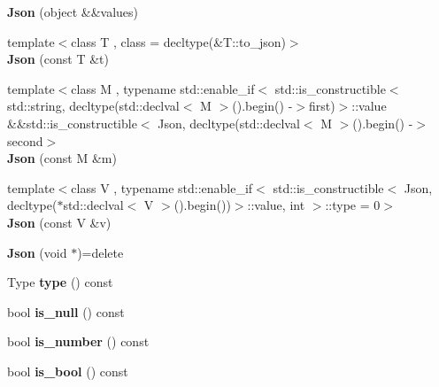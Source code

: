 \begin{DoxyCompactItemize}
{\bfseries Json} (object \&\&values)
\item 
\mbox{\label{classjson11_1_1_json_a68428d2973dd0f8329e76cf8671ac2ee}} 
{\footnotesize template$<$class T , class  = decltype(\&\+T\+::to\+\_\+json)$>$ }\\{\bfseries Json} (const T \&t)
\item 
\mbox{\label{classjson11_1_1_json_a09507879fb68f3ae2e834a1cd07a55dc}} 
{\footnotesize template$<$class M , typename std\+::enable\+\_\+if$<$ std\+::is\+\_\+constructible$<$ std\+::string, decltype(std\+::declval$<$ M $>$().\+begin() -\/$>$first)$>$\+::value \&\&std\+::is\+\_\+constructible$<$ Json, decltype(std\+::declval$<$ M $>$().\+begin() -\/$>$ second$>$ }\\{\bfseries Json} (const M \&m)
\item 
\mbox{\label{classjson11_1_1_json_aad054850a09c0ba50d46f276aa269ce3}} 
{\footnotesize template$<$class V , typename std\+::enable\+\_\+if$<$ std\+::is\+\_\+constructible$<$ Json, decltype($\ast$std\+::declval$<$ V $>$().\+begin())$>$\+::value, int $>$\+::type  = 0$>$ }\\{\bfseries Json} (const V \&v)
\item 
\mbox{\label{classjson11_1_1_json_ae567780835b2ac8514786277cc27bd1c}} 
{\bfseries Json} (void $\ast$)=delete
\item 
\mbox{\label{classjson11_1_1_json_aa9c2e69e711a000bdbd424e6b2f06139}} 
Type {\bfseries type} () const
\item 
\mbox{\label{classjson11_1_1_json_a4ae030733f6ebd910882afb9e2364b1a}} 
bool {\bfseries is\+\_\+null} () const
\item 
\mbox{\label{classjson11_1_1_json_ad93187192190f5aa497bea86afc1717f}} 
bool {\bfseries is\+\_\+number} () const
\item 
\mbox{\label{classjson11_1_1_json_a58226c2f5b5a69c5492de0add2ebb569}} 
bool {\bfseries is\+\_\+bool} () const
\item 
\mbox{\label{classjson11_1_1_json_a38aaf68782261bb98ec34524c09c2752}} 

\end{DoxyCompactItemize}
